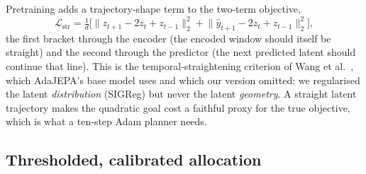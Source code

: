 Pretraining adds a trajectory-shape term to the two-term objective,
\begin{equation}
\mathcal L_{\mathrm{str}}=\tfrac1d\Big[\big\|z_{t+1}-2z_t+z_{t-1}\big\|_2^2
+\big\|\hat y_{t+1}-2z_t+z_{t-1}\big\|_2^2\Big],
\end{equation}
the first bracket through the encoder (the encoded window should itself be straight) and the
second through the predictor (the next predicted latent should continue that line). This is the
temporal-straightening criterion of Wang et al.\ \cite{wang-2026-temporal}, which AdaJEPA's base
model uses and which our version omitted: we regularised the latent \emph{distribution} (SIGReg)
but never the latent \emph{geometry}. A straight latent trajectory makes the quadratic goal cost
a faithful proxy for the true objective, which is what a ten-step Adam planner needs.

\subsection{Thresholded, calibrated allocation}

